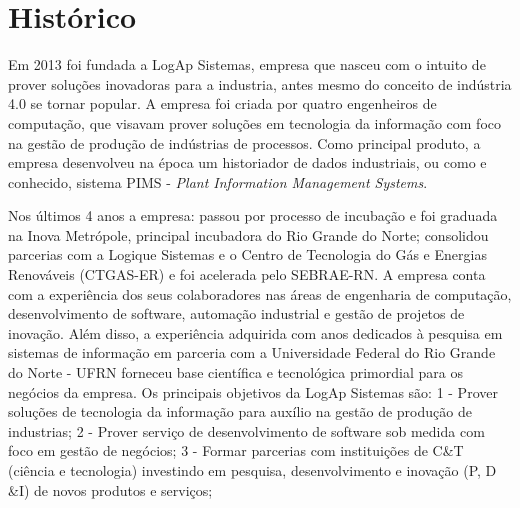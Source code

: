 \section{Histórico}
\label{Sec:historico}

Em 2013 foi fundada a LogAp Sistemas, empresa que nasceu com o intuito de prover soluções inovadoras para a industria, antes mesmo do conceito de indústria 4.0 se tornar popular. A empresa foi criada por quatro engenheiros de computação, que visavam prover soluções em tecnologia da informação com foco na gestão de produção de indústrias de processos. Como principal produto, a empresa desenvolveu na época um historiador de dados industriais, ou como e conhecido, sistema PIMS - \textit{Plant Information Management Systems}.

Nos últimos 4 anos a empresa: passou por processo de incubação e foi graduada na Inova Metrópole, principal incubadora do Rio Grande do Norte; consolidou parcerias com a Logique Sistemas e o Centro de Tecnologia do Gás e Energias Renováveis (CTGAS-ER) e foi acelerada pelo SEBRAE-RN.
A empresa conta com a experiência dos seus colaboradores nas áreas de engenharia de computação, desenvolvimento de software, automação industrial e gestão de projetos de inovação. Além disso, a experiência adquirida com anos dedicados à pesquisa em sistemas de informação em parceria com a Universidade Federal do Rio Grande do Norte - UFRN forneceu base científica e tecnológica primordial para os negócios da empresa.
Os principais objetivos da LogAp Sistemas são:
1 - Prover soluções de tecnologia da informação para auxílio na gestão de produção de industrias;
2 - Prover serviço de desenvolvimento de software sob medida com foco em gestão de negócios;
3 - Formar parcerias com instituições de C&T (ciência e tecnologia) investindo em pesquisa, desenvolvimento e inovação (P, D &I) de novos produtos e serviços;






